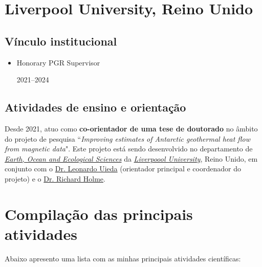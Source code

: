 \section{Liverpool University, Reino Unido}


\subsection*{Vínculo institucional}


\begin{itemize}
	
	\item[\parbox{0.03\textwidth}{\vspace{-0.3\baselineskip}\faClipboardList}]
	{Honorary PGR Supervisor \dotfill \parbox{0.11\textwidth}{\hfill 2021--2024}} 
	
\end{itemize}

\subsection*{Atividades de ensino e orientação}

Desde 2021, atuo como \textbf{co-orientador de uma tese de doutorado} no 
âmbito do projeto de pesquisa ``\textit{Improving estimates of Antarctic geothermal heat flow from magnetic data}". Este projeto está sendo desenvolvido no departamento de
\href{https://www.liverpool.ac.uk/earth-ocean-and-ecological-sciences/}{\textit{Earth, Ocean and Ecological Sciences}} da 
\href{https://www.liverpool.ac.uk/}{\textit{Liverpoool University}}, Reino Unido, em
conjunto com o 
\href{https://www.liverpool.ac.uk/environmental-sciences/staff/leonardo-uieda/}{Dr. Leonardo Uieda} (orientador principal e coordenador do projeto) e o
\href{https://www.liverpool.ac.uk/environmental-sciences/staff/richard-holme/}{Dr. Richard Holme}.


\section{Compilação das principais atividades}


Abaixo apresento uma lista com as minhas principais atividades científicas:

